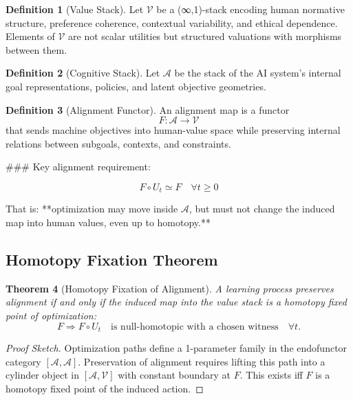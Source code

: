 \documentclass[11pt,a4paper]{article}
\theoremstyle{plain}
\newtheorem{theorem}{Theorem}[section]
\theoremstyle{definition}
\newtheorem{definition}[theorem]{Definition}
\theoremstyle{remark}
\numberwithin{equation}{section}
\begin{document}
\begin{definition}[Value Stack]
Let $\mathcal{V}$ be a (∞,1)-stack encoding human normative structure, preference coherence, contextual variability, and ethical dependence. Elements of $\mathcal{V}$ are not scalar utilities but structured valuations with morphisms between them.
\end{definition}

\begin{definition}[Cognitive Stack]
Let $\mathcal{A}$ be the stack of the AI system’s internal goal representations, policies, and latent objective geometries.
\end{definition}

\begin{definition}[Alignment Functor]
An alignment map is a functor
\[
F : \mathcal{A} \to \mathcal{V}
\]
that sends machine objectives into human-value space while preserving internal relations between subgoals, contexts, and constraints.
\end{definition}

### Key alignment requirement:

\[
F \circ U_t \simeq F \quad \forall t \ge 0
\]

That is: **optimization may move inside $\mathcal{A}$, but must not change the induced map into human values, even up to homotopy.**

\subsection{Homotopy Fixation Theorem}

\begin{theorem}[Homotopy Fixation of Alignment]
A learning process preserves alignment if and only if the induced map into the value stack is a homotopy fixed point of optimization:
\[
F \Rightarrow F \circ U_t \quad \text{is null-homotopic with a chosen witness} \quad \forall t.
\]
\end{theorem}

\begin{proof}[Proof Sketch]
Optimization paths define a 1-parameter family in the endofunctor category $[\mathcal{A},\mathcal{A}]$. Preservation of alignment requires lifting this path into a cylinder object in $[\mathcal{A},\mathcal{V}]$ with constant boundary at $F$. This exists iff $F$ is a homotopy fixed point of the induced action.
\end{proof}
\end{document}
